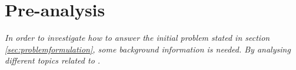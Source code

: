 \chapter{Pre-analysis}
\label{sec:preanalysis}

\textit{In order to investigate how to answer the initial problem stated in section \ref{sec:problemformulation}, some background information is needed. By analysing different topics related to .}






%
%
% 

